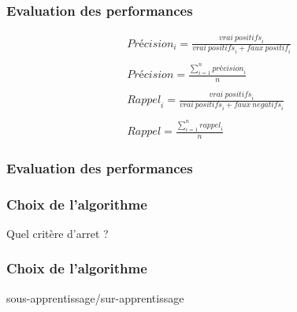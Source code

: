 \documentclass{formation}
\begin{document}
\begin{frame}
  \frametitle{Evaluation des performances}
  \begin{align*}
    &\mathit{Précision}_i = \frac{\mathit{vrai\:positifs}_i}{\mathit{vrai\:positifs}_i+\mathit{faux\:positif}_i} \\
    &\\
    &\mathit{Précision} = \frac{\sum\limits_{i=1}^n \mathit{précision}_i}{n} \\
    &\\
    &\mathit{Rappel}_i = \frac{\mathit{vrai\:positifs}_i}{\mathit{vrai\:positifs}_i+\mathit{faux\:negatifs}_i} \\
    &\\
    &\mathit{Rappel} = \frac{\sum\limits_{i=1}^n \mathit{rappel}_i}{n}
  \end{align*}
\end{frame}

\begin{frame}
  \frametitle{Evaluation des performances}
\end{frame}

\begin{frame}
  \frametitle{Choix de l'algorithme}
  Quel critère d'arret ?
\end{frame}

\begin{frame}
  \frametitle{Choix de l'algorithme}
  sous-apprentissage/sur-apprentissage
\end{frame}
\end{document}
